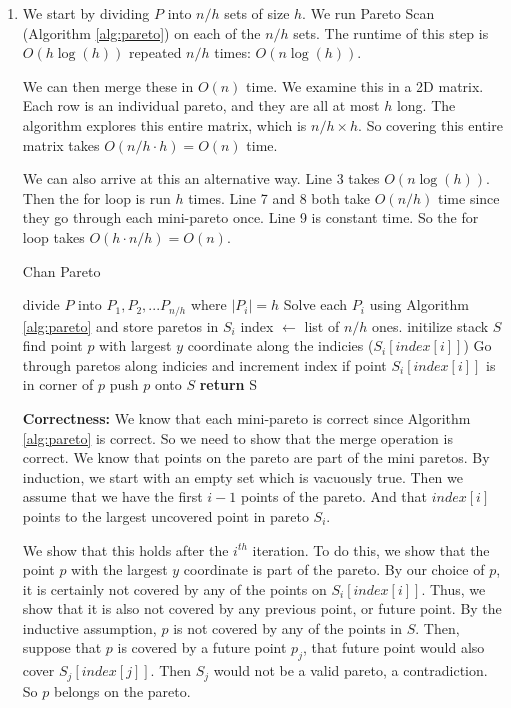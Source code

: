 \documentclass[11pt]{article}
\begin{document}
\begin{enumerate}[1. ]
    \item We start by dividing $P$ into $n/h$ sets of size $h$. 
    We run Pareto Scan (Algorithm \ref{alg:pareto}) on each of the $n/h$ sets.
    The runtime of this step is $O(h \log(h))$ repeated $n/h$ times: $O(n \log (h))$.

    We can then merge these in $O(n)$ time. We examine this in a 2D matrix. Each row is an individual pareto, and they are all at most $h$ long.
    The algorithm explores this entire matrix, which is $n/h \times h$. So covering this entire matrix takes $O(n/h \cdot h) = O(n)$ time.

    We can also arrive at this an alternative way. Line 3 takes $O(n \log (h))$. Then the for loop is run $h$ times.
    Line 7 and 8 both take $O(n/h)$ time since they go through each mini-pareto once. Line 9 is constant time.
    So the for loop takes $O(h \cdot n/h) = O(n)$.

    \begin{algorithm}
        \caption{Chan Pareto}
        \label{alg:chan_pareto}
        \begin{algorithmic}[1]
            \State divide $P$ into $P_1, P_2, ... P_{n/h}$ where $|P_i| = h$
            \State Solve each $P_i$ using Algorithm \ref{alg:pareto} and store paretos in $S_i$
            \State index $\gets$ list of $n/h$ ones. 
            \State initilize stack $S$
                \State find point $p$ with largest $y$ coordinate along the indicies ($S_i[index[i]]$)
                \State Go through paretos along indicies and increment index if point $S_i[index[i]]$ is in corner of $p$
                \State push $p$ onto $S$
            \EndFor
            \State \textbf{return} S
        \EndFunction
        \end{algorithmic}
    \end{algorithm}

    \textbf{Correctness:} We know that each mini-pareto is correct since Algorithm \ref{alg:pareto} is correct.
    So we need to show that the merge operation is correct. We know that points on the pareto are part of the mini paretos. 
    By induction, we start with an empty set which is vacuously true. Then we assume that we have the first $i-1$ points of the pareto. 
    And that $index[i]$ points to the largest uncovered point in pareto $S_i$. 

    We show that this holds after the $i^{th}$ iteration. To do this, we show that the point $p$ with the largest $y$ coordinate is part of the pareto.
    By our choice of $p$, it is certainly not covered by any of the points on $S_i[index[i]]$. Thus, we show that it is also not covered by any previous point, or future point.
    By the inductive assumption, $p$ is not covered by any of the points in $S$. 
    Then, suppose that $p$ is covered by a future point $p_j$, that future point would also cover $S_j[index[j]]$. Then $S_j$
    would not be a valid pareto, a contradiction. So $p$ belongs on the pareto. 


\end{enumerate}
\end{document}
